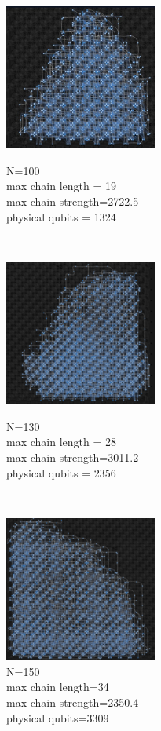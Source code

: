 \documentclass[oneside,a4paper]{article}
\begin{document}
\begin{figure}[htp]
\begin{minipage}[b]{4.5cm}
\includegraphics[width=5cm]{LaTeXTemplate/Images/AdvantageN100.png}
\caption{N=100\\max chain length = 19\\max chain strength=2722.5\\physical qubits = 1324}
\end{minipage}
\ \hspace{2mm} \hspace{2mm} \
\begin{minipage}[b]{4.5cm}
\centering
\includegraphics[width=5cm]{LaTeXTemplate/Images/AdvantageN130.png}
\caption{N=130\\max chain length = 28\\max chain strength=3011.2\\physical qubits = 2356}
\end{minipage}
\ \hspace{2mm} \hspace{2mm} \
\begin{minipage}[b]{4.5cm}
\centering
\includegraphics[width=5cm]{LaTeXTemplate/Images/AdvantageN150.png}
\caption{N=150\\max chain length=34\\max chain strength=2350.4\\physical qubits=3309}
\end{minipage}
\end{figure}
\end{document}
